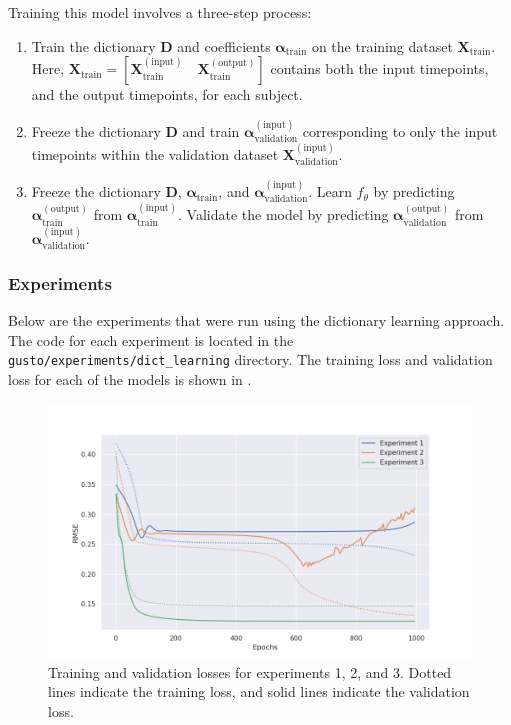 \documentclass[twocolumn, 9pt]{extarticle}
\begin{document}
Training this model involves a three-step process:

\begin{enumerate}
  \item Train the dictionary $\mathbf{D}$ and coefficients $\boldsymbol{\alpha}_{\mathrm{train}}$ on the training dataset $\mathbf{X}_{\mathrm{train}}$. Here, $\mathbf{X}_{\mathrm{train}} = \left[ \mathbf{X}_{\mathrm{train}}^{(\mathrm{input})}\quad \mathbf{X}_{\mathrm{train}}^{(\mathrm{output})} \right]$ contains both the input timepoints, and the output timepoints, for each subject.
  \item Freeze the dictionary $\mathbf{D}$ and train $\boldsymbol{\alpha}_{\mathrm{validation}}^{(\mathrm{input})}$ corresponding to only the input timepoints within the validation dataset $\mathbf{X}_{\mathrm{validation}}^{(\mathrm{input})}$.
  \item Freeze the dictionary $\mathbf{D}$, $\boldsymbol{\alpha}_{\mathrm{train}}$, and $\boldsymbol{\alpha}_{\mathrm{validation}}^{(\mathrm{input})}$. Learn $f_{\theta}$ by predicting $\boldsymbol{\alpha}_{\mathrm{train}}^{(\mathrm{output})}$ from $\boldsymbol{\alpha}_{\mathrm{train}}^{(\mathrm{input})}$. Validate the model by predicting $\boldsymbol{\alpha}_{\mathrm{validation}}^{(\mathrm{output})}$ from $\boldsymbol{\alpha}_{\mathrm{validation}}^{(\mathrm{input})}$.
\end{enumerate}

\subsubsection{Experiments}

Below are the experiments that were run using the dictionary learning approach. The code for each experiment is located in the \texttt{gusto/experiments/dict\_learning} directory. The training loss and validation loss for each of the models is shown in .

\begin{figure}
  \centering
  \includegraphics[width=\columnwidth]{dict_learning_experiments_1_to_3.png}
  \caption{Training and validation losses for experiments 1, 2, and 3. Dotted lines indicate the training loss, and solid lines indicate the validation loss.}
  \label{fig:losses_dict}
\end{figure}
\end{document}
